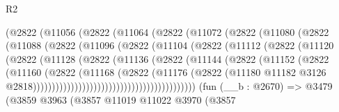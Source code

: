 \begin{lexlean}{R2}
\begin{coremodule}
                      (@2822
                        (@11056
                          (@2822
                            (@11064
                              (@2822
                                (@11072
                                  (@2822
                                    (@11080
                                      (@2822
                                        (@11088
                                          (@2822
                                            (@11096
                                              (@2822
                                                (@11104
                                                  (@2822
                                                    (@11112
                                                      (@2822
                                                        (@11120
                                                          (@2822
                                                            (@11128
                                                              (@2822
                                                                (@11136
                                                                  (@2822
                                                                    (@11144
                                                                      (@2822
                                                                        (@11152
                                                                          (@2822
                                                                            (@11160
                                                                              (@2822
                                                                                (@11168
                                                                                  (@2822
                                                                                    (@11176
                                                                                      (@2822
                                                                                        (@11180
                                                                                          @11182
                                                                                          @3126
                                                                                          @2818)))))))))))))))))))))))))))))))))))))))))))
    (fun (__b : @2670) =>
    @3479
      (@3859
        @3963
        (@3857
          @11019
          @11022
          @3970
          (@3857

\end{coremodule}
\end{lexlean}
